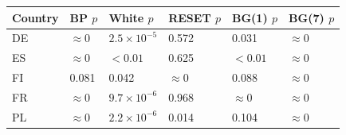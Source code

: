 
\begin{tabular}{llllll}
\toprule
Country & BP $p$ & White $p$ & RESET $p$ & BG(1) $p$ & BG(7) $p$\\
\midrule
DE & $\approx 0$ & $2.5\times 10^{-5}$ & 0.572 & 0.031 & $\approx 0$\\
ES & $\approx 0$ & $<0.01$ & 0.625 & $<0.01$ & $\approx 0$\\
FI & 0.081 & 0.042 & $\approx 0$ & 0.088 & $\approx 0$\\
FR & $\approx 0$ & $9.7\times 10^{-6}$ & 0.968 & $\approx 0$ & $\approx 0$\\
PL & $\approx 0$ & $2.2\times 10^{-6}$ & 0.014 & 0.104 & $\approx 0$\\
\bottomrule
\end{tabular}
